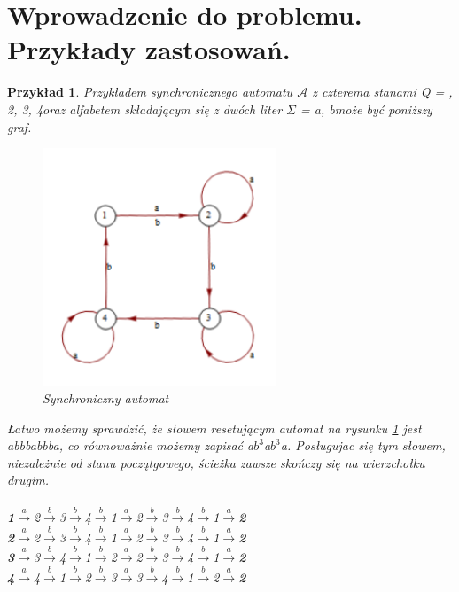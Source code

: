 \documentclass[12pt,a4paper]{article}
\newtheorem{pr}{Przyk{\l}ad}[section]
\begin{document}
\section{Wprowadzenie do problemu. Przyk{\l}ady zastosowa\'{n}.\cite{7}}

\begin{pr}
\label{pr:przyklad1}
Przyk{\l}adem synchronicznego automatu  $\mathscr{A}$ z czterema stanami Q = , 2, 3, 4\textbraceright  oraz alfabetem sk{\l}adaj\k{a}cym si\k{e} z dw\'{o}ch liter $\Sigma$ = \textbraceleft a, b\textbraceright  mo\.{z}e by\'c poni\.{z}szy graf.
\begin{figure}[H]
    \centering
    \includegraphics[width=0.62\textwidth]{rysunek1}
    \caption{Synchroniczny automat}
    \label{fig:rysunek1}
\end{figure}

{\L}atwo mo\.{z}emy sprawdzi\'{c}, \.{z}e s{\l}owem resetuj\k{a}cym automat na rysunku \ref{fig:rysunek1} jest \textit{abbbabbba}, co r\'{o}wnowa\.{z}nie mo\.{z}emy zapisa\'{c} \textit{a$b^{3}$a$b^{3}$a}. Pos{\l}ugujac si\k{e} tym s{\l}owem, niezale\.{z}nie od stanu pocz\k{a}tgowego, \'{s}cie\.{z}ka zawsze sko\'{n}czy si\k{e} na wierzcho{\l}ku drugim.\\
\\
\textbf{1}$\xrightarrow{a}$2$\xrightarrow{b}$3$\xrightarrow{b}$4$\xrightarrow{b}$1$\xrightarrow{a}$2$\xrightarrow{b}$3$\xrightarrow{b}$4$\xrightarrow{b}$1$\xrightarrow{a}$\textbf{2}\\
\textbf{2}$\xrightarrow{a}$2$\xrightarrow{b}$3$\xrightarrow{b}$4$\xrightarrow{b}$1$\xrightarrow{a}$2$\xrightarrow{b}$3$\xrightarrow{b}$4$\xrightarrow{b}$1$\xrightarrow{a}$\textbf{2}\\
\textbf{3}$\xrightarrow{a}$3$\xrightarrow{b}$4$\xrightarrow{b}$1$\xrightarrow{b}$2$\xrightarrow{a}$2$\xrightarrow{b}$3$\xrightarrow{b}$4$\xrightarrow{b}$1$\xrightarrow{a}$\textbf{2}\\
\textbf{4}$\xrightarrow{a}$4$\xrightarrow{b}$1$\xrightarrow{b}$2$\xrightarrow{b}$3$\xrightarrow{a}$3$\xrightarrow{b}$4$\xrightarrow{b}$1$\xrightarrow{b}$2$\xrightarrow{a}$\textbf{2}
\end{pr}
\end{document}

